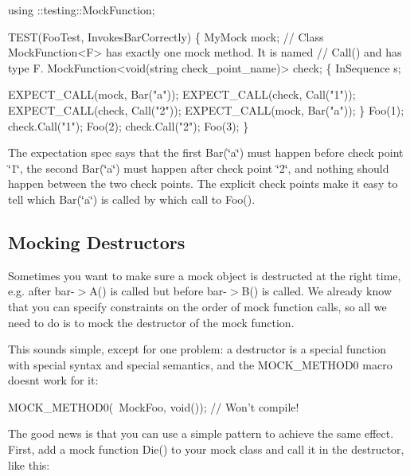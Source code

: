 \begin{DoxyCode}
using ::testing::MockFunction;

TEST(FooTest, InvokesBarCorrectly) \{
  MyMock mock;
  \textcolor{comment}{// Class MockFunction<F> has exactly one mock method.  It is named}
  \textcolor{comment}{// Call() and has type F.}
  MockFunction<void(string check\_point\_name)> check;
  \{
    InSequence s;

    EXPECT\_CALL(mock, Bar(\textcolor{stringliteral}{"a"}));
    EXPECT\_CALL(check, Call(\textcolor{stringliteral}{"1"}));
    EXPECT\_CALL(check, Call(\textcolor{stringliteral}{"2"}));
    EXPECT\_CALL(mock, Bar(\textcolor{stringliteral}{"a"}));
  \}
  Foo(1);
  check.Call(\textcolor{stringliteral}{"1"});
  Foo(2);
  check.Call(\textcolor{stringliteral}{"2"});
  Foo(3);
\}
\end{DoxyCode}


The expectation spec says that the first {\ttfamily Bar(\char`\"{}a\char`\"{})} must happen before check point \char`\"{}1\char`\"{}, the second {\ttfamily Bar(\char`\"{}a\char`\"{})} must happen after check point \char`\"{}2\char`\"{}, and nothing should happen between the two check points. The explicit check points make it easy to tell which {\ttfamily Bar(\char`\"{}a\char`\"{})} is called by which call to {\ttfamily Foo()}.

\subsection*{Mocking Destructors}

Sometimes you want to make sure a mock object is destructed at the right time, e.\+g. after {\ttfamily bar-\/$>$A()} is called but before {\ttfamily bar-\/$>$B()} is called. We already know that you can specify constraints on the order of mock function calls, so all we need to do is to mock the destructor of the mock function.

This sounds simple, except for one problem\+: a destructor is a special function with special syntax and special semantics, and the {\ttfamily M\+O\+C\+K\+\_\+\+M\+E\+T\+H\+O\+D0} macro doesn\textquotesingle{}t work for it\+:


\begin{DoxyCode}
MOCK\_METHOD0(~MockFoo, \textcolor{keywordtype}{void}());  \textcolor{comment}{// Won't compile!}
\end{DoxyCode}


The good news is that you can use a simple pattern to achieve the same effect. First, add a mock function {\ttfamily Die()} to your mock class and call it in the destructor, like this\+:


